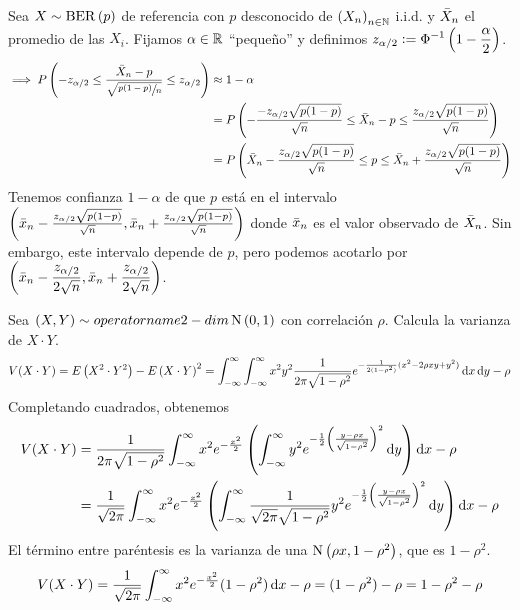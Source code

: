 \begin{ejem}
	Sea $X\sim \operatorname{BER}\left(p\right)$ de referencia con $p$ desconocido de $\left(X_n\right)_{n\in\mathbb{N}}$ i.i.d. y $\Bar{X}_n$ el promedio de las $X_i$. Fijamos $\alpha \in \mathbb{R}$ ``pequeño'' y definimos $\displaystyle z_{\alpha/2} \vcentcolon= \Phi^{-1}\left(1-\frac{\alpha}{2}\right)$.
	\[\begin{aligned}
			\implies P\left(-z_{\alpha/2} \leq \frac{\Bar{X}_n - p}{\sqrt{\sfrac{p(1-p)}{n}}} \leq z_{\alpha/2}\right) & \approx 1-\alpha                                                                                                                          \\
			                                                                                                           & = P\left(-\frac{-z_{\alpha/2}\sqrt{p(1-p)}}{\sqrt{n}} \leq \Bar{X}_n - p \leq \frac{z_{\alpha/2}\sqrt{p(1-p)}}{\sqrt{n}}\right)           \\
			                                                                                                           & = P\left(\Bar{X}_n - \frac{z_{\alpha/2}\sqrt{p(1-p)}}{\sqrt{n}} \leq p \leq \Bar{X}_n + \frac{z_{\alpha/2}\sqrt{p(1-p)}}{\sqrt{n}}\right)
		\end{aligned}\]
	Tenemos confianza $1-\alpha$ de que $p$ está en el intervalo $\left(\Bar{x}_n - \frac{z_{\alpha/2}\sqrt{p(1-p)}}{\sqrt{n}}, \Bar{x}_n + \frac{z_{\alpha/2}\sqrt{p(1-p)}}{\sqrt{n}}\right)$ donde $\Bar{x}_n$ es el valor observado de $\Bar{X}_n$. Sin embargo, este intervalo depende de $p$, pero podemos acotarlo por $\displaystyle \left(\Bar{x}_n - \frac{z_{\alpha/2}}{2\sqrt{n}}, \Bar{x}_n + \frac{z_{\alpha/2}}{2\sqrt{n}}\right)$.
\end{ejem}


\begin{ejer}
	Sea $(X, Y) \sim \\operatorname{2-dim}\operatorname{N}\left(0,1\right)$ con correlación $\rho$. Calcula la varianza de $X\cdot Y$.
	\[V(X\cdot Y) = E\left(X^2\cdot Y^2\right) - E\left(X\cdot Y\right)^2 = \int_{-\infty}^{\infty} \int_{-\infty}^{\infty} x^2y^2\frac{1}{2\pi\sqrt{1-\rho^2}}e^{-\frac{1}{2(1-\rho^2)}(x^2-2\rho xy + y^2)}\odif{x} \odif{y} - \rho\]
	Completando cuadrados, obtenemos
	\[\begin{aligned} %
			V(X\cdot Y) & = \frac{1}{2\pi\sqrt{1-\rho^2}}\int_{-\infty}^{\infty} x^2 e^{-\frac{x^2}{2}} \left(\int_{-\infty}^{\infty} y^2 e^{-\frac{1}{2}\left(\frac{y-\rho x}{\sqrt{1-\rho^2}}\right)^2}\odif{y}\right)\odif{x} -                     \rho           \\
			            & = \frac{1}{\sqrt{2\pi}} \int_{-\infty}^{\infty} x^2 e^{-\frac{x^2}{2}} \left(\int_{-\infty}^{\infty} \frac{1}{\sqrt{2\pi}\sqrt{1-\rho^2}}y^2 e^{-\frac{1}{2}\left(\frac{y-\rho x}{\sqrt{1-\rho^2}}\right)^2}\odif{y}\right) \odif{x} - \rho
		\end{aligned}\]
	El término entre paréntesis es la varianza de una $\operatorname{N}\left(\rho x, 1-\rho^2\right)$, que es $1-\rho^2$.
	\[V(X\cdot Y) = \frac{1}{\sqrt{2\pi}} \int_{-\infty}^{\infty} x^2 e^{-\frac{x^2}{2}}(1-\rho^2)\odif{x} - \rho = (1-\rho^2) - \rho = 1-\rho^2-\rho\]
\end{ejer}